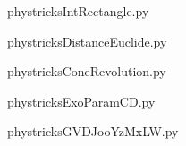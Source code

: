     

    \clearpage
    


    \newcommand{\CaptionFigIntRectangle}{<+Type your caption here+>}
    \begin{center}
        
    \end{center}
    phystricksIntRectangle.py

    

    \clearpage
    


    \newcommand{\CaptionFigDistanceEuclide}{<+Type your caption here+>}
    \begin{center}
        
    \end{center}
    phystricksDistanceEuclide.py

    

    \clearpage
    


    \newcommand{\CaptionFigConeRevolution}{<+Type your caption here+>}
    \begin{center}
        
    \end{center}
    phystricksConeRevolution.py

    

    \clearpage
    


    \newcommand{\CaptionFigExoParamCD}{<+Type your caption here+>}
    \begin{center}
        
    \end{center}
    phystricksExoParamCD.py

    

    \clearpage
    


    \newcommand{\CaptionFigGVDJooYzMxLW}{<+Type your caption here+>}
    \begin{center}
        
    \end{center}
    phystricksGVDJooYzMxLW.py

    

    \clearpage
    


